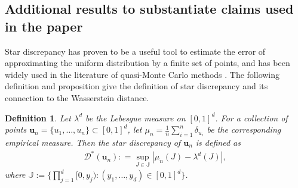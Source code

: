 \documentclass[11pt]{article}
\newtheorem{defn}{Definition}
\newcommand{\bs}[1]{\boldsymbol{#1}}
\begin{document}
\subsection{Additional results to substantiate claims used in the paper}

Star discrepancy has proven to be a useful tool to estimate the error of approximating the uniform distribution by a finite set of points, and has been widely used in the literature of quasi-Monte Carlo methods \citep[see, e.g.,][Chapter~2]{niederreiter1992random}. The following definition and proposition give the definition of star discrepancy and its connection to the Wasserstein distance.
\begin{defn}\label{def:StarDiscrepancy}
Let $\lambda^d$ be the Lebesgue measure on $[0, 1]^d$. For a collection of points ${\bs u_n} = \{u_1, \ldots, u_n\} \subset [0, 1]^d$, let $\mu_n = \frac{1}{n}\sum_{i = 1}^n \delta_{u_i}$ be the corresponding empirical measure. Then the star discrepancy of ${\bs u_n}$ is defined as
\begin{align*}
    \mathcal{D}^*({\bs u}_n) : = \sup_{J \in \mathbb{J}}| \mu_n(J) - \lambda^d(J)|,
\end{align*}
where $\mathbb{J}:= \bigl\{\prod_{j = 1}^d [0, y_j): (y_1, \ldots, y_d) \in [0, 1]^d\bigr\}$.
\end{defn}
\end{document}
